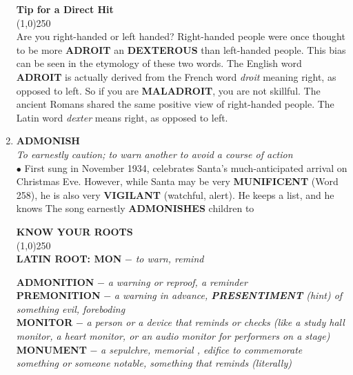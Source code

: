 \documentclass{book}
\begin{document}
\begin{enumerate}
\begin{tcolorbox}
\begin{center}
 \textbf{Tip for a Direct Hit }\\
 \line(1,0){250}\\
Are you right-handed or left handed? Right-handed people were once thought to be more \textbf{ADROIT} an     \textbf{DEXTEROUS} than left-handed people. This bias can be seen in the etymology of these two words. The English word \textbf{ADROIT} is actually derived from the French word \textit{droit} meaning right, as opposed to left. So if you are \textbf{MALADROIT}, you are not skillful. The ancient Romans shared the same positive view of right-handed people. The Latin word \textit{dexter} means right, as opposed to left.   

\end{center}
\end{tcolorbox} 


\item \textbf{ADMONISH}\\
\textit{ To earnestly caution; to warn another to avoid a course of action}\\

$\bullet$ First sung in November 1934,  celebrates Santa's much-anticipated arrival on Christmas Eve. However, while Santa may be very \textbf{MUNIFICENT} (Word 258), he is also very \textbf{VIGILANT} (watchful, alert). He keeps a list, and he knows  The song earnestly \textbf{ADMONISHES} children to 
\begin{tcolorbox}
\begin{center}
 \textbf{KNOW YOUR ROOTS}\\
 \line(1,0){250}\\
  \textbf{ LATIN ROOT: MON} $ - $ \textit{ to warn, remind} 
\end{center}
 \textbf{ADMONITION} $ - $ \textit{ a warning or reproof, a reminder}\\ \textbf{PREMONITION} $ - $ \textit{ a warning in advance, \textbf{PRESENTIMENT} (hint) of something evil, foreboding}\\
\textbf{MONITOR} $ - $  \textit{ a person or a device that reminds or checks (like a study hall monitor, a heart  monitor, or an audio monitor for performers on a stage)} \\
\textbf{MONUMENT} $ - $ \textit{ a sepulchre, memorial , edifice to commemorate something or someone notable,  something that reminds (literally)}
\end{tcolorbox} 
 

\end{enumerate}
\end{document}

